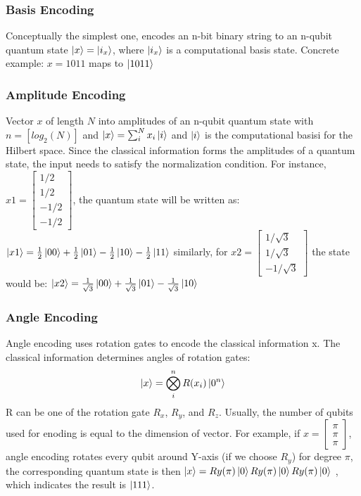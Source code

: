 \documentclass{article}
\begin{document}
\subsubsection*{Basis Encoding}
Conceptually the simplest one, encodes an n-bit binary string to an n-qubit 
quantum state $\ket{x} = \ket{i_x}$, where $\ket{i_x}$ is a computational
basis state. Concrete example: $ x =1011 $ maps to $\ket{1011}$

\subsubsection*{Amplitude Encoding}
Vector $x$ of length $N$ into amplitudes of an n-qubit quantum 
state with $n = [log_2(N)]$ and $
  \ket{x} = \sum^N_i x_i \ket{i} $
and $\ket{i}$ is the computational basisi for the Hilbert space. Since 
the classical information forms the amplitudes of a quantum state, the 
input needs to satisfy the normalization condition. For instance, 
$x1 = \begin{bmatrix}
  1/2 \\ 1/2 \\ -1/2 \\-1/2
\end{bmatrix}$, the quantum state will be written as: 
$\ket{x1} = \frac{1}{2} \ket{00} + \frac{1}{2} 
\ket{01} - \frac{1}{2} \ket{10} - \frac{1}{2} \ket{11}$
similarly, for $x2 = \begin{bmatrix}
  1/\sqrt{3} \\ 1/\sqrt{3} \\ -1/\sqrt{3} 
\end{bmatrix}$ the state would be:
$\ket{x2} = \frac{1}{\sqrt{3}} \ket{00} 
+ \frac{1}{\sqrt{3}} \ket{01} - \frac{1}{\sqrt{3}} \ket{10} $

\subsubsection*{Angle Encoding}
Angle encoding uses rotation gates to encode the classical information x. 
The classical information determines angles of rotation gates:
\begin{equation}
  \ket{x} = \bigotimes_i^n R(x_i) \ket{0^n}
\end{equation}
R can be one of the rotation gate $R_x$, $R_y$, and $R_z$. Usually, the 
number of qubits used for enoding is equal to the dimension of vector. For example, 
if $x = \begin{bmatrix}
  \pi \\ \pi \\ \pi 
\end{bmatrix}$, angle encoding rotates every qubit around Y-axis (if we choose $R_y$)
for degree $\pi$, the corresponding quantum state is then $\ket{x} = Ry(\pi) \ket{0} Ry(\pi) \ket{0} Ry(\pi) \ket{0}$
, which indicates the result is $\ket{111}$.
\end{document}

